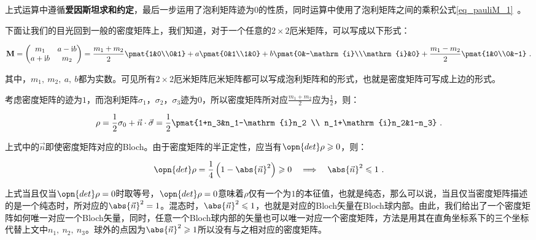 上式运算中遵循\textbf{爱因斯坦求和约定}，最后一步运用了泡利矩阵迹为$0$的性质，同时运算中使用了泡利矩阵之间的乘积公式\autoref{eq_pauliM_1}~。

下面让我们的目光回到一般的密度矩阵上，我们知道，对于一个任意的$2\times 2$厄米矩阵，可以写成以下形式：

\begin{equation}
\mathbf{M} = \begin{pmatrix}
    m_1 & a - \mathrm{i}b \\
    a + \mathrm{i}b & m_2
    \end{pmatrix} = 
    \frac{m_1 + m_2}{2}\pmat{1&0\\0&1} + a\pmat{0&1\\1&0} + b\pmat{0&-\mathrm{i}\\\mathrm{i}&0} + \frac{m_1-m_2}{2}\pmat{1&0\\0&-1}~.
\end{equation}

其中，$m_1,~m_2,~a,~b$都为实数。可见所有$2\times 2$厄米矩阵厄米矩阵都可以写成泡利矩阵和的形式，也就是密度矩阵可写成上边的形式。

考虑密度矩阵的迹为$1$，而泡利矩阵$\sigma_1$，$\sigma_2$，$\sigma_3$迹为0，所以密度矩阵所对应$\frac{m_1+m_2}{2}$应为$\frac{1}{2}$，则：

\begin{equation}
\rho = \frac{1}{2}\sigma_0 + \vec{n}\cdot \vec{\sigma} = \frac{1}{2}\pmat{1+n_3&n_1-\mathrm{i}n_2 \\ n_1+\mathrm{i}n_2&1-n_3}~.
\end{equation}

上式中的$\vec{n}$即使密度矩阵对应的Bloch。由于密度矩阵的半正定性，应当有$\opn{det}\rho \geqslant 0$，则：

\begin{equation}
\opn{det}\rho = \frac{1}{4}\left( 1 - \abs{\vec{n}}^2 \right)\geqslant0\quad \Longrightarrow \quad\abs{\vec{n}}^2 \leqslant 1~.
\end{equation}

上式当且仅当$\opn{det} \rho = 0 $时取等号，$\opn{det}\rho = 0$意味着$\rho$仅有一个为$1$的本征值，也就是纯态，那么可以说，当且仅当密度矩阵描述的是一个纯态时，所对应的$\abs{\vec{n}}^2 = 1$。混态时，$\abs{\vec{n}}^2\leqslant 1$，也就是对应的Bloch矢量在Bloch球内部。由此，我们给出了一个密度矩阵如何唯一对应一个Bloch矢量，同时，任意一个Bloch球内部的矢量也可以唯一对应一个密度矩阵，方法是用其在直角坐标系下的三个坐标代替上文中$n_1,~n_2,~n_3$。球外的点因为$\abs{\vec{n}}^2\geqslant1$所以没有与之相对应的密度矩阵。

